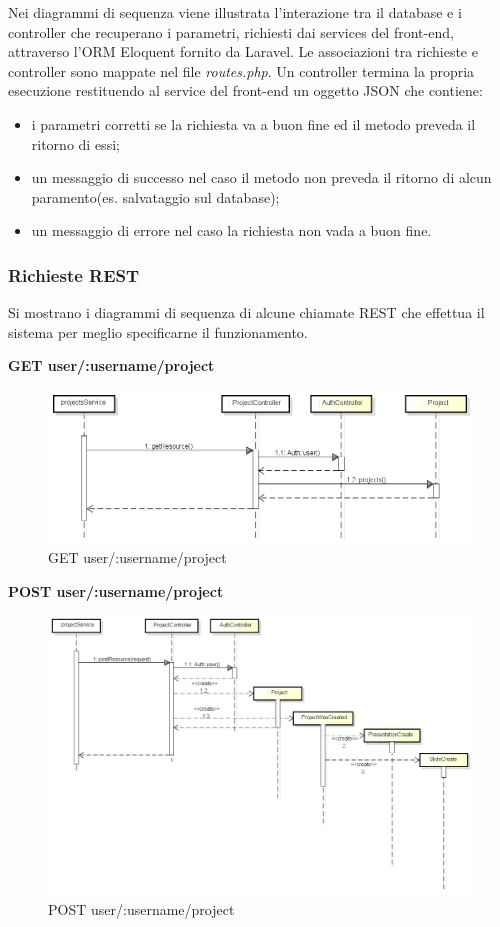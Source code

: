 Nei diagrammi di sequenza viene illustrata l'interazione tra il \gls{database} e i controller che recuperano i parametri, richiesti dai services del front-end, attraverso l'\gls{ORM} Eloquent fornito da \gls{Laravel}. Le associazioni tra richieste e controller sono mappate nel file \textit{routes.php}. Un controller termina la propria esecuzione restituendo al service del front-end un oggetto JSON che contiene:
\begin{itemize}
	\item i parametri corretti se la richiesta va a buon fine ed il metodo preveda il ritorno di essi;
	\item un messaggio di successo nel caso il metodo non preveda il ritorno di alcun paramento(es. salvataggio sul \gls{database});
	\item un messaggio di errore nel caso la richiesta non vada a buon fine.
\end{itemize}

\subsubsection{Richieste REST}
Si mostrano i diagrammi di sequenza di alcune chiamate REST che effettua il sistema per meglio specificarne il funzionamento.

\newpage

\textbf{GET user/:username/project}
	\begin{figure}[h]
		\centering
		\includegraphics[width=0.7\linewidth]{img/GET_projects}
		\caption[GET user/:username/project]{GET user/:username/project}
		\label{fig:GET user/:username/project}
	\end{figure}

\textbf{POST user/:username/project}
	\begin{figure}[h]
		\centering
		\includegraphics[width=0.6\linewidth]{img/POST_project}
		\caption[POST user/:username/project]{POST user/:username/project}
		\label{fig:POST user/:username/project}
	\end{figure}

